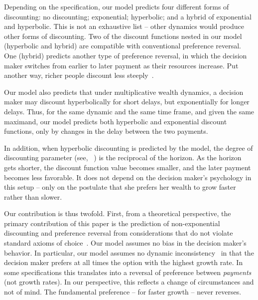 Depending on the specification, our model predicts four different forms of discounting: no discounting; exponential; hyperbolic; and a hybrid of exponential and hyperbolic. This is not an exhaustive list -- other dynamics would produce other forms of discounting. Two of the discount functions nested in our model (hyperbolic and hybrid) are compatible with conventional preference reversal. One (hybrid) predicts another type of preference reversal, in which the decision maker switches from earlier to later payment as their resources increase. Put another way, richer people discount less steeply~\citep{GreenETAL1996,EpperETAL2018}.

Our model also predicts that under multiplicative wealth dynamics, a decision maker may discount hyperbolically for short delays, but exponentially for longer delays. Thus, for the same dynamic and the same time frame, and given the same maximand, our model predicts both hyperbolic and exponential discount functions, only by changes in the delay between the two payments.

In addition, when hyperbolic discounting is predicted by the model, the degree of discounting parameter (see, \eg~\citet{LoewensteinPrelec1992,Laibson1997}) is the reciprocal of the horizon. As the horizon gets shorter, the discount function value becomes smaller, and the later payment becomes less favorable. It does not depend on the decision maker's psychology in this setup -- only on the postulate that she prefers her wealth to grow faster rather than slower.

Our contribution is thus twofold. First, from a theoretical perspective, the primary contribution of this paper is the prediction of non-exponential discounting and preference reversal from considerations that do not violate standard axioms of choice~\citep{vonNeumannMorgenstern1944}. Our model assumes no bias in the decision maker's behavior. In particular, our model assumes no dynamic inconsistency~\citep[p.~3]{CohenETAL2019} in that the decision maker prefers at all times the option with the highest growth rate. In some specifications this translates into a reversal of preference between {\it payments} (not growth rates). In our perspective, this reflects a change of circumstances and not of mind. The fundamental preference -- for faster growth -- never reverses.

